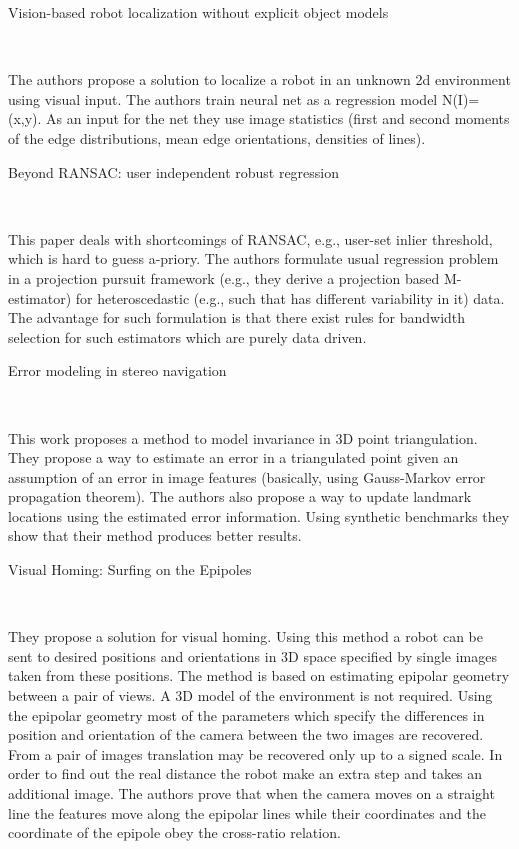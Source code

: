 \documentclass[10pt]{article}         %
\begin{document}
\begin{enumerate}
  {\Large \item Vision-based robot localization without explicit
    object models}~\cite{dudek1996vision}

  The authors propose a solution to localize a robot in an unknown 2d
  environment using visual input. The authors train neural net as a
  regression model N(I)=(x,y).  As an input for the net they use image
  statistics (first and second moments of the edge distributions, mean
  edge orientations, densities of lines).

  {\Large \item Beyond RANSAC: user independent robust
    regression}~\cite{subbarao2006beyond}

  This paper deals with shortcomings of RANSAC, e.g., user-set inlier
  threshold, which is hard to guess a-priory.  The authors formulate
  usual regression problem in a projection pursuit framework (e.g.,
  they derive a projection based M-estimator) for heteroscedastic
  (e.g., such that has different variability in it) data.  The
  advantage for such formulation is that there exist rules for
  bandwidth selection for such estimators which are purely data
  driven.


  {\Large \item Error modeling in stereo navigation}~\cite{matthies1987error}
  
  This work proposes a method to model invariance in 3D point
  triangulation.  They propose a way to estimate an error in a
  triangulated point given an assumption of an error in image features
  (basically, using Gauss-Markov error propagation theorem).  The
  authors also propose a way to update landmark locations using the
  estimated error information.  Using synthetic benchmarks they show
  that their method produces better results.

  {\Large \item Visual Homing: Surfing on the Epipoles}~\cite{basri1999visual}

  They propose a solution for visual homing.  Using this method a
  robot can be sent to desired positions and orientations in 3D space
  specified by single images taken from these positions.  The method
  is based on estimating epipolar geometry between a pair of views. A
  3D model of the environment is not required.  Using the epipolar
  geometry most of the parameters which specify the differences in
  position and orientation of the camera between the two images are
  recovered.  From a pair of images translation may be recovered only
  up to a signed scale.  In order to find out the real distance the
  robot make an extra step and takes an additional image.  The authors
  prove that when the camera moves on a straight line the features
  move along the epipolar lines while their coordinates and the
  coordinate of the epipole obey the cross-ratio relation.


\end{enumerate}
\end{document}
